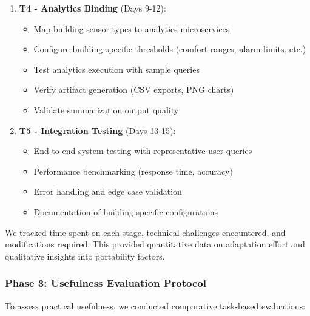 \documentclass[acmlarge]{acmart}
\begin{document}
\begin{enumerate}
    \item \textbf{T4 - Analytics Binding} (Days 9-12):
    \begin{itemize}
        \item Map building sensor types to analytics microservices
        \item Configure building-specific thresholds (comfort ranges, alarm limits, etc.)
        \item Test analytics execution with sample queries
        \item Verify artifact generation (CSV exports, PNG charts)
        \item Validate summarization output quality
    \end{itemize}
    
    \item \textbf{T5 - Integration Testing} (Days 13-15):
    \begin{itemize}
        \item End-to-end system testing with representative user queries
        \item Performance benchmarking (response time, accuracy)
        \item Error handling and edge case validation
        \item Documentation of building-specific configurations
    \end{itemize}
\end{enumerate}

We tracked time spent on each stage, technical challenges encountered, and modifications required. This provided quantitative data on adaptation effort and qualitative insights into portability factors.

\subsubsection{Phase 3: Usefulness Evaluation Protocol}

To assess practical usefulness, we conducted comparative task-based evaluations:
\end{document}
